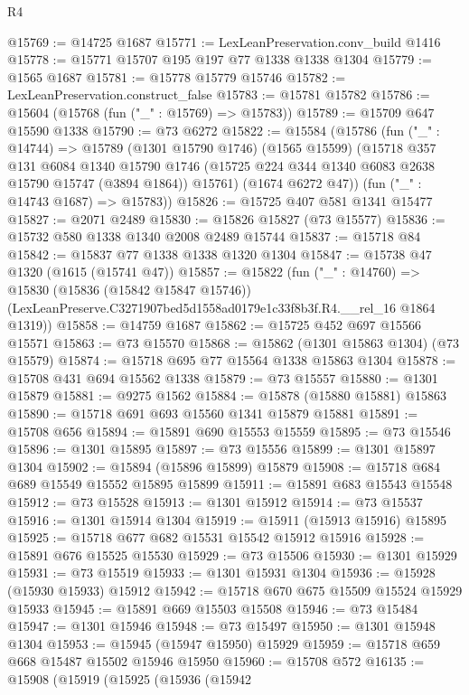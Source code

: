 \begin{lexlean}{R4}
\begin{coremodule}
@15769 := @14725 @1687
@15771 := LexLeanPreservation.conv_build @1416
@15778 := @15771 @15707 @195 @197 @77 @1338 @1338 @1304
@15779 := @1565 @1687
@15781 := @15778 @15779 @15746
@15782 := LexLeanPreservation.construct_false
@15783 := @15781 @15782
@15786 := @15604 (@15768 (fun ("_" : @15769) => @15783))
@15789 := @15709 @647 @15590 @1338
@15790 := @73 @6272
@15822 := @15584
    (@15786
      (fun ("_" : @14744) =>
      @15789
        (@1301 @15790 @1746)
        (@1565 @15599)
        (@15718
          @357
          @131
          @6084
          @1340
          @15790
          @1746
          (@15725 @224 @344 @1340 @6083 @2638 @15790 @15747 (@3894 @1864))
          @15761)
        (@1674 @6272 @47))
      (fun ("_" : @14743 @1687) => @15783))
@15826 := @15725 @407 @581 @1341 @15477
@15827 := @2071 @2489
@15830 := @15826 @15827 (@73 @15577)
@15836 := @15732 @580 @1338 @1340 @2008 @2489 @15744
@15837 := @15718 @84
@15842 := @15837 @77 @1338 @1338 @1320 @1304
@15847 := @15738 @47 @1320 (@1615 (@15741 @47))
@15857 := @15822
    (fun ("_" : @14760) =>
    @15830
      (@15836 (@15842 @15847 @15746))
      (LexLeanPreserve.C3271907bed5d1558ad0179e1c33f8b3f.R4.__rel_16 @1864 @1319))
@15858 := @14759 @1687
@15862 := @15725 @452 @697 @15566 @15571
@15863 := @73 @15570
@15868 := @15862 (@1301 @15863 @1304) (@73 @15579)
@15874 := @15718 @695 @77 @15564 @1338 @15863 @1304
@15878 := @15708 @431 @694 @15562 @1338
@15879 := @73 @15557
@15880 := @1301 @15879
@15881 := @9275 @1562
@15884 := @15878 (@15880 @15881) @15863
@15890 := @15718 @691 @693 @15560 @1341 @15879 @15881
@15891 := @15708 @656
@15894 := @15891 @690 @15553 @15559
@15895 := @73 @15546
@15896 := @1301 @15895
@15897 := @73 @15556
@15899 := @1301 @15897 @1304
@15902 := @15894 (@15896 @15899) @15879
@15908 := @15718 @684 @689 @15549 @15552 @15895 @15899
@15911 := @15891 @683 @15543 @15548
@15912 := @73 @15528
@15913 := @1301 @15912
@15914 := @73 @15537
@15916 := @1301 @15914 @1304
@15919 := @15911 (@15913 @15916) @15895
@15925 := @15718 @677 @682 @15531 @15542 @15912 @15916
@15928 := @15891 @676 @15525 @15530
@15929 := @73 @15506
@15930 := @1301 @15929
@15931 := @73 @15519
@15933 := @1301 @15931 @1304
@15936 := @15928 (@15930 @15933) @15912
@15942 := @15718 @670 @675 @15509 @15524 @15929 @15933
@15945 := @15891 @669 @15503 @15508
@15946 := @73 @15484
@15947 := @1301 @15946
@15948 := @73 @15497
@15950 := @1301 @15948 @1304
@15953 := @15945 (@15947 @15950) @15929
@15959 := @15718 @659 @668 @15487 @15502 @15946 @15950
@15960 := @15708 @572
@16135 := @15908
    (@15919
      (@15925
        (@15936
          (@15942

\end{coremodule}
\end{lexlean}
